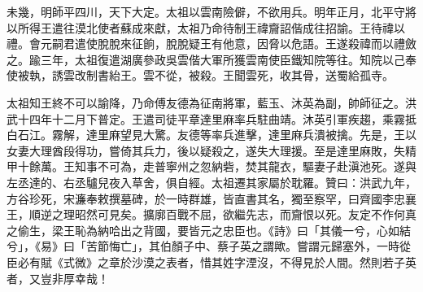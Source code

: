 未幾，明師平四川，天下大定。太祖以雲南險僻，不欲用兵。明年正月，北平守將以所得王遣往漠北使者蘇成來獻，太祖乃命待制王禕齎詔偕成往招諭。王待禕以禮。會元嗣君遣使脫脫來征餉，脫脫疑王有他意，因脅以危語。王遂殺禕而以禮斂之。踰三年，太祖復遣湖廣參政吳雲偕大軍所獲雲南使臣鐵知院等往。知院以己奉使被執，誘雲改制書紿王。雲不從，被殺。王聞雲死，收其骨，送蜀給孤寺。

太祖知王終不可以諭降，乃命傅友德為征南將軍，藍玉、沐英為副，帥師征之。洪武十四年十二月下普定。王遣司徒平章達里麻率兵駐曲靖。沐英引軍疾趨，乘霧抵白石江。霧解，達里麻望見大驚。友德等率兵進擊，達里麻兵潰被擒。先是，王以女妻大理酋段得功，嘗倚其兵力，後以疑殺之，遂失大理援。至是達里麻敗，失精甲十餘萬。王知事不可為，走普寧州之忽納砦，焚其龍衣，驅妻子赴滇池死。遂與左丞達的、右丞驢兒夜入草舍，俱自經。太祖遷其家屬於耽羅。贊曰：洪武九年，方谷珍死，宋濂奉敕撰墓碑，於一時群雄，皆直書其名，獨至察罕，曰齊國李忠襄王，順逆之理昭然可見矣。擴廓百戰不屈，欲繼先志，而齎恨以死。友定不作何真之偷生，梁王恥為納哈出之背國，要皆元之忠臣也。《詩》曰「其儀一兮，心如結兮」，《易》曰「苦節悔亡」，其伯顏子中、蔡子英之謂歟。嘗謂元歸塞外，一時從臣必有賦《式微》之章於沙漠之表者，惜其姓字湮沒，不得見於人間。然則若子英者，又豈非厚幸哉！

